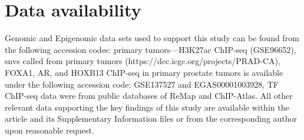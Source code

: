 \section{Data availability}

Genomic and Epigenomic data sets used to support this study can be found from the following accession codes: primary tumors—H3K27ac ChIP-seq (GSE96652), \glspl{snv} called from primary tumors (https://dcc.icgc.org/projects/PRAD-CA), FOXA1, AR, and HOXB13 ChIP-seq in primary prostate tumors is available under the following accession code: GSE137527 and EGAS00001003928, TF ChIP-seq data were from public databases of ReMap and ChIP-Atlas.
All other relevant data supporting the key findings of this study are available within the article and its Supplementary Information files or from the corresponding author upon reasonable request.
